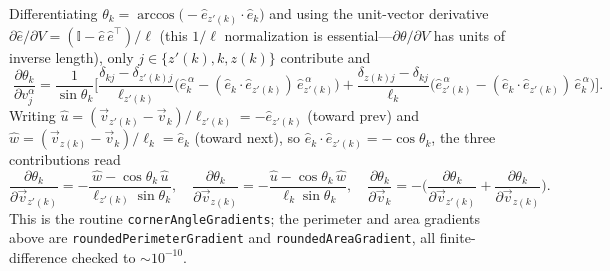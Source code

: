 \documentclass[11pt]{article}
\newcommand{\eh}[1]{\hat{e}_{#1}}        %
\newcommand{\dd}[2]{\frac{\partial #1}{\partial #2}}
\begin{document}
Differentiating $\theta_k = \arccos\!\big(-\eh{z'(k)}\cdot\eh{k}\big)$ and using the unit-vector
derivative $\partial\hat e/\partial V = (\mathbb{I}-\hat e\,\hat e^{\top})/\ell$ (this
$1/\ell$ normalization is essential---$\partial\theta/\partial V$ has units of inverse
length), only $j\in\{z'(k),k,z(k)\}$ contribute and
\[
  \boxed{\;
  \dd{\theta_k}{v_j^\alpha}
  = \frac{1}{\sin\theta_k}\Bigg[
    \frac{\delta_{kj}-\delta_{z'(k)j}}{\ell_{z'(k)}}
      \Big(\eh{k}^{\,\alpha} - (\eh{k}\!\cdot\!\eh{z'(k)})\,\eh{z'(k)}^{\,\alpha}\Big)
    + \frac{\delta_{z(k)j}-\delta_{kj}}{\ell_{k}}
      \Big(\eh{z'(k)}^{\,\alpha} - (\eh{k}\!\cdot\!\eh{z'(k)})\,\eh{k}^{\,\alpha}\Big)
  \Bigg].
  \;}
\]
Writing $\hat u = (\vec v_{z'(k)}-\vec v_k)/\ell_{z'(k)} = -\eh{z'(k)}$ (toward prev) and
$\hat w = (\vec v_{z(k)}-\vec v_k)/\ell_k = \eh{k}$ (toward next), so
$\eh{k}\!\cdot\!\eh{z'(k)} = -\cos\theta_k$, the three contributions read
\[
  \dd{\theta_k}{\vec v_{z'(k)}} = -\frac{\hat w - \cos\theta_k\,\hat u}{\ell_{z'(k)}\sin\theta_k},\quad
  \dd{\theta_k}{\vec v_{z(k)}}  = -\frac{\hat u - \cos\theta_k\,\hat w}{\ell_{k}\sin\theta_k},\quad
  \dd{\theta_k}{\vec v_{k}}     = -\Big(\dd{\theta_k}{\vec v_{z'(k)}} + \dd{\theta_k}{\vec v_{z(k)}}\Big).
\]
This is the routine \texttt{cornerAngleGradients}; the perimeter and area gradients above are
\texttt{roundedPerimeterGradient} and \texttt{roundedAreaGradient}, all finite-difference
checked to $\sim 10^{-10}$.
\end{document}
